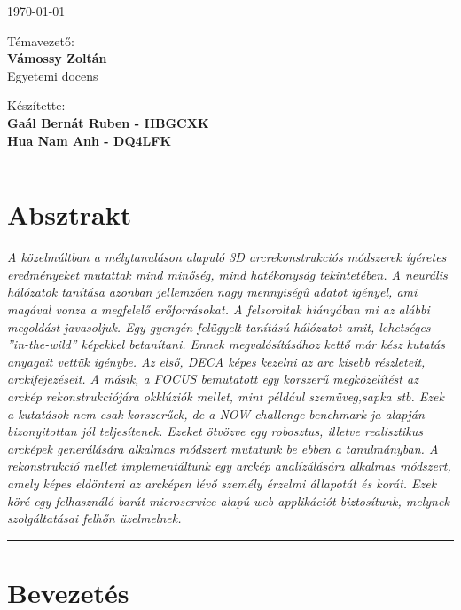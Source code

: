 \documentclass[12pt,a4]{article}
\begin{document}
\begin{titlepage}
\begin{center}
			\vspace{0.2cm}
			\large
			\today
			
			\vspace{1cm}
			
			Témavezető:\\
			\textbf{Vámossy Zoltán}\\
			Egyetemi docens
			
			\vspace{1cm}
			
			Készítette:\\
			\textbf{Gaál Bernát Ruben - HBGCXK\\
			Hua Nam Anh - DQ4LFK}					
		\end{center}
	\end{titlepage}
	\renewcommand*\contentsname{Tartalomjegyzék}
	\tableofcontents
	\newpage
	\par\noindent\rule{\textwidth}{0.4pt}
	\section*{Absztrakt}
	 \emph{
		A közelmúltban a mélytanuláson alapuló 3D arcrekonstrukciós módszerek
		ígéretes eredményeket mutattak mind minőség, mind hatékonyság tekintetében. A neurális hálózatok tanítása azonban jellemzően nagy mennyiségű
		adatot igényel, ami magával vonza a megfelelő erőforrásokat.
		A felsoroltak hiányában mi az alábbi megoldást javasoljuk. Egy gyengén
		felügyelt tanítású hálózatot amit, lehetséges ”in-the-wild” képekkel betanítani.
		Ennek megvalósításához kettő már kész kutatás anyagait vettük igénybe. Az
		első, \cite{deca}DECA képes kezelni az arc kisebb részleteit, arckifejezéseit. A
		másik, a \cite{focus}FOCUS bemutatott egy korszerű megközelítést az arckép rekonstrukciójára okklúziók mellet, mint például szemüveg,sapka stb. Ezek a kutatások nem csak korszerűek, de a NOW challenge benchmark-ja alapján bizonyitottan jól teljesítenek. Ezeket ötvözve egy robosztus, illetve realisztikus
		arcképek generálására alkalmas módszert mutatunk be ebben a tanulmányban.
		A rekonstrukció mellet implementáltunk egy arckép analízálására alkalmas módszert, amely képes eldönteni az arcképen lévő személy érzelmi
		állapotát és korát. Ezek köré egy felhasználó barát microservice alapú web
		applikációt biztosítunk, melynek szolgáltatásai felhőn üzelmelnek.
		}
	 \par\noindent\rule{\textwidth}{0.4pt}
	 
	 \section{Bevezetés}
	  
\end{document}
